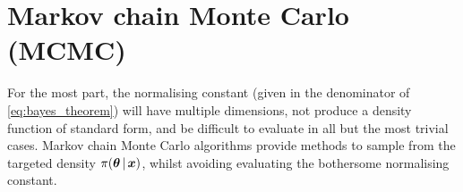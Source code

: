\section{Markov chain Monte Carlo (MCMC)}
\label{sec:mcmc}

For the most part, the normalising constant (given in the denominator of
\cref{eq:bayes_theorem}) will have multiple dimensions, not produce a density function of
standard form, and be difficult to evaluate in all but the most trivial cases. Markov
chain Monte Carlo algorithms provide methods to sample from the targeted density
$\pi(\bm{\theta} \,|\, \bm{x})$, whilst avoiding evaluating the bothersome normalising
constant.

%
%
%

